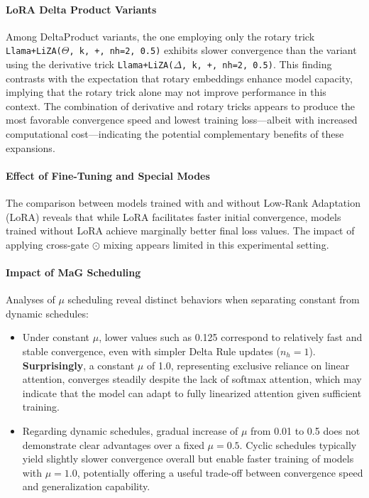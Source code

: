 \documentclass[10pt,a4paper]{article}
\begin{document}
\paragraph{LoRA Delta Product Variants}

Among DeltaProduct variants, the one employing only the rotary trick 
\texttt{Llama+LiZA(}\(\Theta\)\texttt{, k, +, nh=2, 0.5)} exhibits slower convergence than the variant using the derivative trick \texttt{Llama+LiZA(}\(\Delta\)\texttt{, k, +, nh=2, 0.5)}. This finding contrasts with the expectation that rotary embeddings enhance model capacity, implying that the rotary trick alone may not improve performance in this context. The combination of derivative and rotary tricks appears to produce the most favorable convergence speed and lowest training loss—albeit with increased computational cost—indicating the potential complementary benefits of these expansions.

\paragraph{Effect of Fine-Tuning and Special Modes}

The comparison between models trained with and without Low-Rank Adaptation (LoRA) reveals that while LoRA facilitates faster initial convergence, models trained without LoRA achieve marginally better final loss values. The impact of applying cross-gate $\odot$ mixing appears limited in this experimental setting.

\paragraph{Impact of MaG Scheduling}

Analyses of \(\mu\) scheduling reveal distinct behaviors when separating constant from dynamic schedules:

\begin{itemize}
    \item Under constant \(\mu\), lower values such as 0.125 correspond to relatively fast and stable convergence, even with simpler Delta Rule updates (\(n_h=1\)). \textbf{Surprisingly}, a constant \(\mu\) of 1.0, representing exclusive reliance on linear attention, converges steadily despite the lack of softmax attention, which may indicate that the model can adapt to fully linearized attention given sufficient training.
    \item Regarding dynamic schedules, gradual increase of \(\mu\) from 0.01 to 0.5 does not demonstrate clear advantages over a fixed \(\mu = 0.5\). Cyclic schedules typically yield slightly slower convergence overall but enable faster training of models with \(\mu=1.0\), potentially offering a useful trade-off between convergence speed and generalization capability.
\end{itemize}
\end{document}
